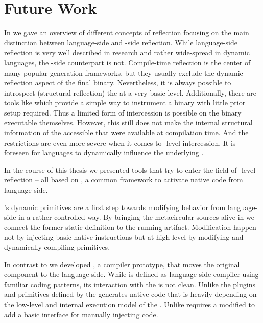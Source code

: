 
\chapter{Future Work}
\minitoc
\introduction

In  we gave an overview of different concepts of reflection focusing on the main distinction between language-side and \VM-side reflection.
While language-side reflection is very well described in research and rather wide-spread in dynamic languages, the \VM-side counterpart is not.
Compile-time reflection is the center of many popular \VM generation frameworks, but they usually exclude the dynamic reflection aspect of the final binary.
Nevertheless, it is always possible to introspect (structural reflection) the \VM at a very basic level.
Additionally, there are tools like \DTrace which provide a simple way to instrument a binary with little prior setup required.
Thus a limited form of intercession is possible on the binary executable themselves.
However, this still does not make the internal structural information of the \VM accessible that were available at compilation time.
And the restrictions are even more severe when it comes to \VM-level intercession.
It is foreseen for languages to dynamically influence the underlying \VM.

In the course of this thesis we presented tools that try to enter the field of \VM-level reflection -- all based on \B, a common framework to activate native code from language-side.

\WF's dynamic primitives are a first step towards modifying \VM behavior from language-side in a rather controlled way.
By bringing the metacircular \VM sources alive in \PH we connect the former static definition to the running artifact.
Modification happen not by injecting basic native instructions but at high-level by modifying and dynamically compiling primitives.

In contrast to \WF we developed \NBJ, a \JIT compiler prototype, that moves the original \VM component to the language-side.
While \NBJ is defined as language-side compiler using familiar coding patterns, its interaction with the \VM is not clean.
Unlike the plugins and primitives defined by \WF the \JIT generates native code that is heavily depending on the low-level and internal execution model of the \VM.
Unlike \WF \NBJ requires a modified \VM to add a basic interface for manually injecting \JIT code.

